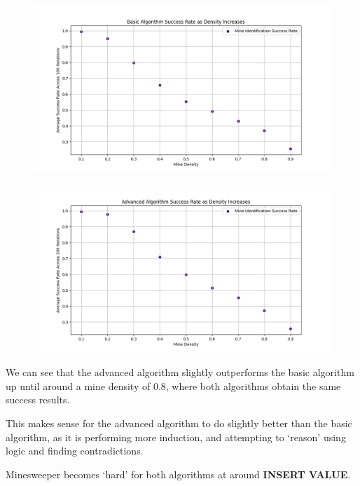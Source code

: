 \documentclass[12pt, twoside]{article}
\begin{document}
\begin{enumerate}[itemsep=2mm,parsep=4mm]
        \begin{figure}[H]
            \centering
            \includegraphics[scale = 0.55]{Basic Algorithm.png}
        \end{figure}
        \begin{figure}[H]
            \centering
            \includegraphics[scale = 0.55]{Advanced Algorithm.png}
        \end{figure}

        We can see that the advanced algorithm slightly outperforms the basic algorithm up until around a mine density of 0.8, where both algorithms obtain the same success results.

        This makes sense for the advanced algorithm to do slightly better than the basic algorithm, as it is performing more induction, and attempting to `reason' using logic and finding contradictions.

        Minesweeper becomes `hard' for both algorithms at around \textbf{INSERT VALUE}.


\end{enumerate}
\end{document}
